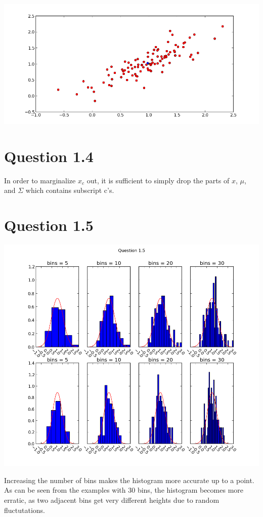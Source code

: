 \documentclass[11pt,a4paper]{article}
\begin{document}
\includegraphics[width=1.1\textwidth]{figure_2.png}
\section{Question 1.4}
In order to marginalize $x_c$ out, it is sufficient to simply drop the parts of $x$, $\mu$, and $\Sigma$ which contains subscript c's. 
\section{Question 1.5}
\includegraphics[width=1.1\textwidth]{figure_3.png}

Increasing the number of bins makes the histogram more accurate up to a point. As can be seen from the examples with 30 bins, the histogram becomes more erratic, as two adjacent bins get very different heights due to random fluctutations.
\end{document}
